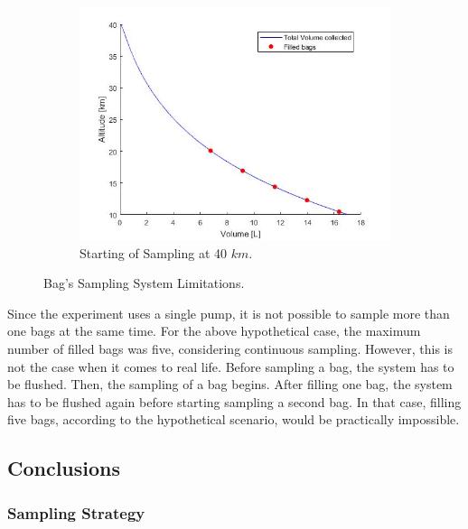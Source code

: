 \documentclass[a4paper,12pt,twoside]{article}
\begin{document}
\begin{appendices}
\begin{figure}[H]
\begin{subfigure}{0.45\textwidth}
    \centering\includegraphics[width=1.2\textwidth]{appendix/img/samplevolume40km.png}
    \caption{Starting of Sampling at 40 $km$.}
  \end{subfigure}
  \caption{Bag's Sampling System Limitations.}\label{fig:limits}
\end{figure}


\bigskip
{}

\smallskip
Since the experiment uses a single pump, it is not possible to sample more than one bags at the same time. For the above hypothetical case, the maximum number of filled bags was five, considering continuous sampling. However, this is not the case when it comes to real life. Before sampling a bag, the system has to be flushed. Then, the sampling of a bag begins. After filling one bag, the system has to be flushed again before starting sampling a second bag. In that case, filling five bags, according to the hypothetical scenario, would be practically impossible.


\newpage
\subsection{Conclusions}

\subsubsection{Sampling Strategy}


\end{appendices}
\end{document}
